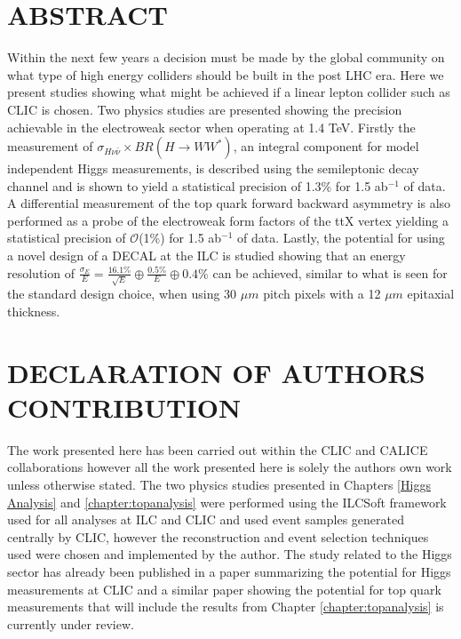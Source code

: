 \chapter*{ABSTRACT}
%
Within the next few years a decision must be made by the global community on what type of high energy colliders should be built in the post LHC era. Here we present studies showing what might be achieved if a linear lepton collider such as \ac{CLIC} is chosen. Two physics studies are presented showing the precision achievable in the electroweak sector when operating at 1.4 TeV. Firstly the measurement of $\sigma_{H\nu\bar{\nu}} \times BR(H\rightarrow WW^*)$, an integral component for model independent Higgs measurements, is described using the semileptonic decay channel and is shown to yield a statistical precision of 1.3\% for 1.5 ab$^{-1}$ of data. A differential measurement of the top quark forward backward asymmetry is also performed as a probe of the electroweak form factors of the ttX vertex yielding a statistical precision of $\mathcal{O}$(1\%) for 1.5 ab$^{-1}$ of data. Lastly, the potential for using a novel design of a \ac{DECAL} at the \ac{ILC} is studied showing that an energy resolution of $\frac{\sigma_E}{E}=\frac{16.1\%}{\sqrt{E}} \oplus \frac{0.5\%}{E} \oplus 0.4\%$ can be achieved, similar to what is seen for the standard design choice, when using 30 $\mu m$ pitch pixels with a 12 $\mu m$ epitaxial thickness.

%
\clearpage
\chapter*{DECLARATION OF AUTHORS CONTRIBUTION}
%
The work presented here has been carried out within the \ac{CLIC} and \ac{CALICE} collaborations however all the work presented here is solely the authors own work unless otherwise stated. The two physics studies presented in Chapters \ref{Higgs Analysis} and \ref{chapter:topanalysis} were performed using the ILCSoft framework used for all analyses at \ac{ILC} and \ac{CLIC} and used event samples generated centrally by \ac{CLIC}, however the reconstruction and event selection techniques used were chosen and implemented by the author. The study related to the Higgs sector has already been published in a paper summarizing the potential for Higgs measurements\cite{Abramowicz:2016zbo} at \ac{CLIC} and a similar paper showing the potential for top quark measurements that will include the results from Chapter \ref{chapter:topanalysis} is currently under review\cite{TopPaperDraft}.


